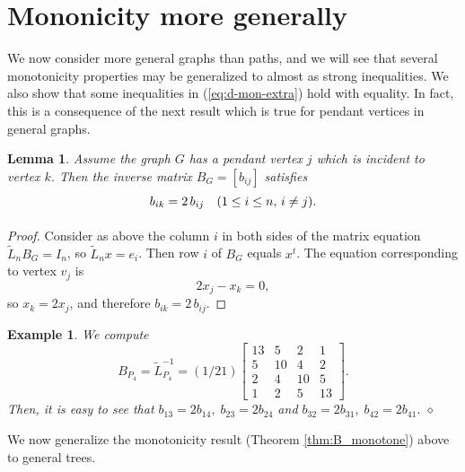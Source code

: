 \documentclass[12pt]{article}
\newtheorem{lemma}[theorem]{Lemma}
\newtheorem{example}{Example}
\begin{document}
\section{Mononicity more generally}

We now consider more general graphs than paths, and we will see that several monotonicity  properties may be generalized to almost as strong inequalities. 
We also show  that some inequalities in (\ref{eq:d-mon-extra}) hold with equality. In fact, this is a consequence of the next result which is true for pendant vertices in general graphs. 



\begin{lemma}
 \label{lem:pendant}
 Assume the graph $G$ has a pendant vertex $j$ which is incident to vertex $k$. Then the  inverse matrix $B_G=[b_{ij}]$ satisfies 
%
 \begin{equation}
 \label{eq:B_pendant}
 \begin{array}{cl} \vspace{0.1cm}
     b_{ik} = 2 \,b_{ij}   &(1 \le i \le n, \,i \not = j).
 \end{array}    
 \end{equation}
\end{lemma}

\begin{proof}
 Consider as above the column $i$ in both sides of the matrix equation $\tilde{L}_n B_G=I_n$,  so $\tilde{L}_n x=e_i$. Then row $i$ of $B_G$ equals $x^t$. The equation corresponding to vertex $v_j$ is 
 \[
    2 x_j-x_k=0,
 \]
%
so $x_k=2x_j$, and therefore $b_{ik} = 2 \,b_{ij}$.
\end{proof}

\begin{example} \label{inverseforpath}
{\rm We  compute 
\[
B_{P_4}=\tilde{L}_{P_4} ^{-1}=(1/21)\left[ \begin{array}{cccc}
13&5&2& 1\\
5&10&4&2\\
2&4&10&5\\
1&2&5&13
\end{array}
\right].
\]
%
Then, it is easy to see that $b_{13}= 2 b_{14},\; b_{23}= 2 b_{24}$ and $b_{32}= 2 b_{31},\; b_{42}= 2 b_{41}.$ \hfill{$\diamond$}
}
\end{example} 

\bigskip
We now generalize the monotonicity result (Theorem \ref{thm:B_monotone}) above to general trees. 
\end{document}
